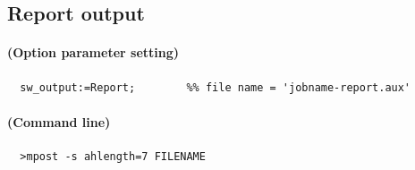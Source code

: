\documentclass[a4paper]{article}
\begin{document}
\subsection{Report output}
\paragraph{(Option parameter setting)}
%
%
\begin{verbatim}
  sw_output:=Report;        %% file name = 'jobname-report.aux'
\end{verbatim}
\paragraph{(Command line)}
\begin{verbatim}
  >mpost -s ahlength=7 FILENAME
\end{verbatim}
\end{document}
